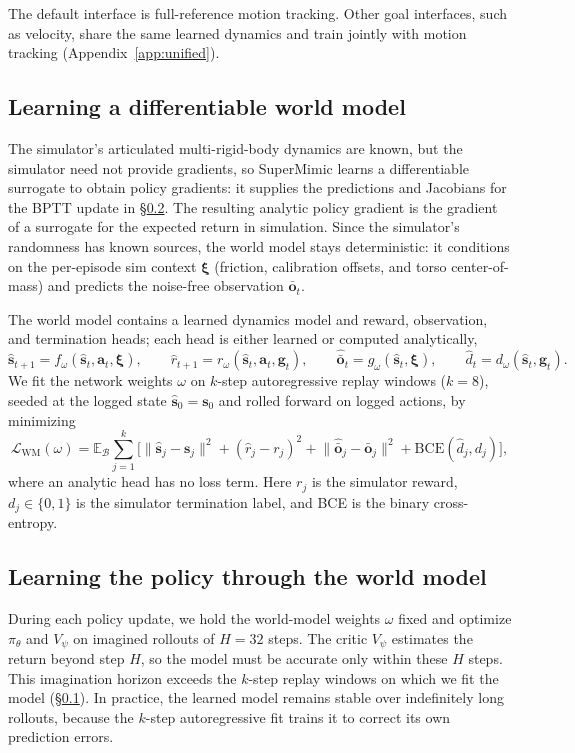 The default interface is full-reference motion tracking. Other goal interfaces, such as velocity, share the same learned dynamics and train jointly with motion tracking (Appendix~\ref{app:unified}).

\subsection{Learning a differentiable world model}
\label{sec:wm}
The simulator's articulated multi-rigid-body dynamics are known, but the simulator need not provide gradients, so SuperMimic learns a differentiable surrogate to obtain policy gradients: it supplies the predictions and Jacobians for the BPTT update in \S\ref{sec:policy}. The resulting analytic policy gradient is the gradient of a surrogate for the expected return in simulation. Since the simulator's randomness has known sources, the world model stays deterministic: it conditions on the per-episode sim context $\bm{\xi}$ (friction, calibration offsets, and torso center-of-mass) and predicts the noise-free observation $\bar{\bm{o}}_t$.

The world model contains a learned dynamics model and reward, observation, and termination heads; each head is either learned or computed analytically,
\[
  \hat{\bm{s}}_{t+1}=f_\omega(\hat{\bm{s}}_t,\bm{a}_t,\bm{\xi}),\qquad
  \hat{r}_{t+1}=r_\omega(\hat{\bm{s}}_t,\bm{a}_t,\bm{g}_t),\qquad
  \hat{\bar{\bm{o}}}_t=g_\omega(\hat{\bm{s}}_t,\bm{\xi}),\qquad
  \hat{d}_t=d_\omega(\hat{\bm{s}}_t,\bm{g}_t).
\]
We fit the network weights $\omega$ on $k$-step autoregressive replay windows ($k{=}8$), seeded at the logged state $\hat{\bm{s}}_0=\bm{s}_0$ and rolled forward on logged actions, by minimizing
\begin{equation}
\label{eq:wm-loss}
  \mathcal{L}_{\text{WM}}(\omega) = \mathbb{E}_{\mathcal{B}} \sum_{j=1}^{k} \Big[ \lVert \hat{\bm{s}}_{j} - \bm{s}_{j} \rVert^2 + (\hat{r}_{j} - r_{j})^2 + \lVert \hat{\bar{\bm{o}}}_{j} - \bar{\bm{o}}_{j} \rVert^2 + \mathrm{BCE}(\hat{d}_{j}, d_{j}) \Big],
\end{equation}
where an analytic head has no loss term. Here $r_j$ is the simulator reward, $d_j\in\{0,1\}$ is the simulator termination label, and BCE is the binary cross-entropy.

\subsection{Learning the policy through the world model}
\label{sec:policy}
During each policy update, we hold the world-model weights $\omega$ fixed and optimize $\pi_\theta$ and $V_\psi$ on imagined rollouts of $H{=}32$ steps. The critic $V_\psi$ estimates the return beyond step $H$, so the model must be accurate only within these $H$ steps. This imagination horizon exceeds the $k$-step replay windows on which we fit the model (\S\ref{sec:wm}). In practice, the learned model remains stable over indefinitely long rollouts, because the $k$-step autoregressive fit trains it to correct its own prediction errors.

